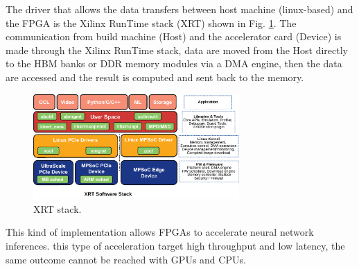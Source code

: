 \documentclass[../../main.tex]{subfiles}
\begin{document}
The driver that allows the data transfers between host machine (linux-based) and the FPGA is the Xilinx RunTime stack (XRT) shown in Fig. \ref{fig:Alveo_XRT}. The communication from build machine (Host) and the accelerator card (Device) is made through the Xilinx RunTime stack, data are moved from the Host directly to the HBM banks or DDR memory modules via a DMA engine, then the data are accessed and the result is computed and sent back to the memory.
    
\begin{figure}[h]
    \centering
    \includegraphics[width=0.7\textwidth]{sections/04/Images/XRT-Layers.pdf}
    \caption{XRT stack.}
    \label{fig:Alveo_XRT}
\end{figure}  

This kind of implementation allows FPGAs to accelerate neural network inferences. this type of acceleration target high throughput and low latency, the same outcome cannot be reached with GPUs and CPUs\cite{ALVEO-NN}.
\end{document}
